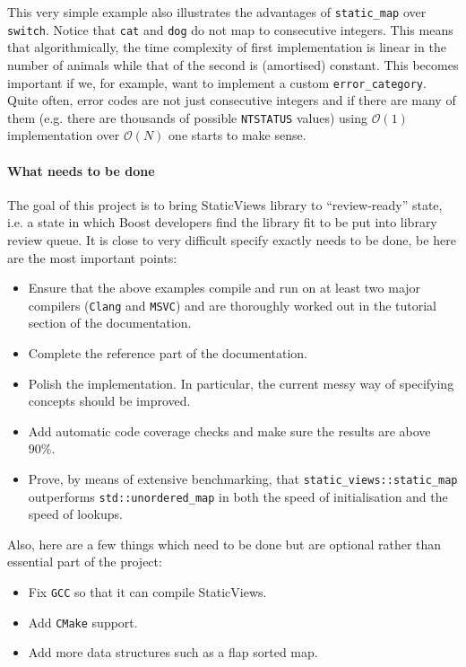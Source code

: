 \documentclass[a4paper,12pt]{article}
\begin{document}
    This very simple example also illustrates the advantages of
    \texttt{static\_map} over \texttt{switch}. Notice that \texttt{cat} and
    \texttt{dog} do not map to consecutive integers. This means that
    algorithmically, the time complexity of first implementation is linear in
    the number of animals while that of the second is (amortised) constant. This
    becomes important if we, for example, want to implement a custom
    \texttt{error\_category}. Quite often, error codes are not just consecutive
    integers and if there are many of them (e.g. there are thousands of possible
    \texttt{NTSTATUS} values) using $\mathcal{O}(1)$ implementation over
    $\mathcal{O}(N)$ one starts to make sense.

    \paragraph{What needs to be done} The goal of this project is to bring
    StaticViews library to ``review-ready'' state, i.e. a state in which Boost
    developers find the library fit to be put into library review queue. It is
    close to very difficult specify exactly needs to be done, be here are the
    most important points:
    \begin{itemize}
        \item Ensure that the above examples compile and run on at least two
            major compilers (\texttt{Clang} and \texttt{MSVC}) and are
            thoroughly worked out in the tutorial section of the documentation.
        \item Complete the reference part of the documentation.
        \item Polish the implementation. In particular, the current messy way of
            specifying concepts should be improved.
        \item Add automatic code coverage checks and make sure the results are
            above 90\%.
        \item Prove, by means of extensive benchmarking, that
            \texttt{static\_views::static\_map} outperforms
            \texttt{std::unordered\_map} in both the speed of initialisation and
            the speed of lookups.
    \end{itemize}
    Also, here are a few things which need to be done but are optional rather
    than essential part of the project:
    \begin{itemize}
        \item Fix \texttt{GCC} so that it can compile StaticViews.
        \item Add \texttt{CMake} support.
        \item Add more data structures such as a flap sorted map.
    \end{itemize}
\end{document}
